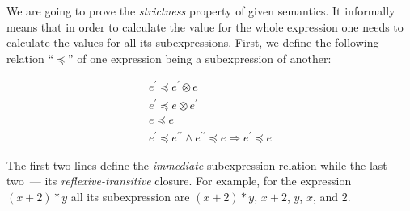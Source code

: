 \documentclass{article}
\begin{document}
We are going to prove the \emph{strictness} property of given semantics. It informally means that in order to calculate the
value for the whole expression one needs to calculate the values for all its subexpressions. First, we define the
following relation ``$\preceq$'' of one expression being a subexpression of another:

\[
\begin{array}{c}
  e^\prime \preceq e^\prime\otimes e \\
  e^\prime \preceq e\otimes e^\prime \\
  e\preceq e \\
  e^\prime\preceq e^{\prime\prime} \wedge e^{\prime\prime}\preceq e \Rightarrow e^\prime\preceq e
\end{array}  
\]

The first two lines define the \emph{immediate} subexpression relation while the last two~--- its \emph{reflexive-transitive}
closure. For example, for the expression $(x+2)*y$ all its subexpression are $(x+2)*y$, $x+2$, $y$, $x$, and $2$. 
\end{document}
